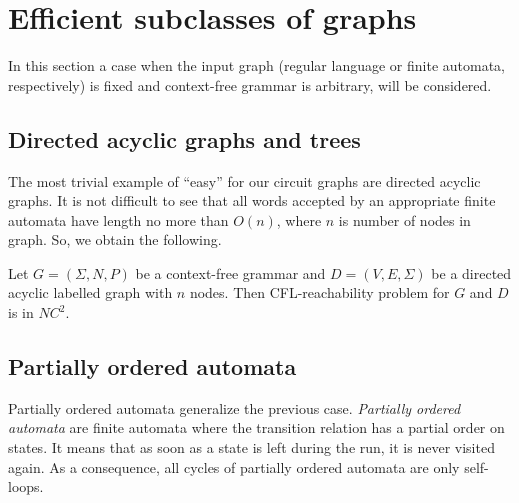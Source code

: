\section{Efficient subclasses of graphs}
In this section a case when the input graph (regular language or finite automata, respectively) is fixed and context-free grammar is arbitrary, will be considered.
\subsection{Directed acyclic graphs and trees}
The most trivial example of ``easy'' for our circuit graphs are directed acyclic graphs. It is not difficult to see that all words accepted by an appropriate finite automata have length no more than $O(n)$, where $n$ is number of nodes in graph. So, we obtain the following.
\begin{corollary} 
Let  $G = (\Sigma, N, P)$ be a context-free grammar and $D=(V, E, \Sigma)$ be a directed acyclic labelled graph with $n$ nodes. Then CFL-reachability problem for $G$ and $D$ is in $NC^2$.
\end{corollary}
\subsection{Partially ordered automata}

Partially ordered automata generalize the previous case. \textit{Partially ordered automata} are finite automata where the transition relation has a partial
order on states. It means that as soon as a state is left during the run, it is never visited again.  As a consequence, all cycles of partially ordered automata are only self-loops.


